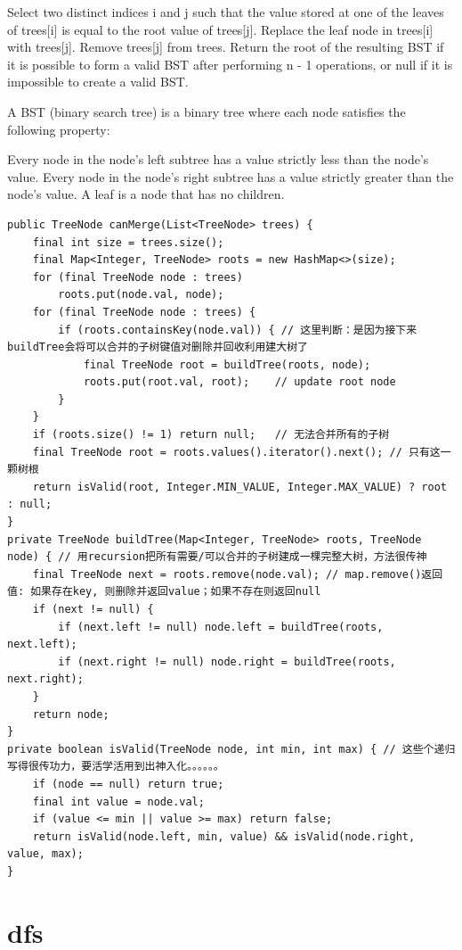 \documentclass[9pt, b5paper]{article}
\begin{document}
Select two distinct indices i and j such that the value stored at one of the leaves of trees[i] is equal to the root value of trees[j].
Replace the leaf node in trees[i] with trees[j].
Remove trees[j] from trees.
Return the root of the resulting BST if it is possible to form a valid BST after performing n - 1 operations, or null if it is impossible to create a valid BST.

A BST (binary search tree) is a binary tree where each node satisfies the following property:

Every node in the node's left subtree has a value strictly less than the node's value.
Every node in the node's right subtree has a value strictly greater than the node's value.
A leaf is a node that has no children.
\begin{verbatim}
public TreeNode canMerge(List<TreeNode> trees) {
    final int size = trees.size();
    final Map<Integer, TreeNode> roots = new HashMap<>(size);
    for (final TreeNode node : trees) 
        roots.put(node.val, node);
    for (final TreeNode node : trees) {
        if (roots.containsKey(node.val)) { // 这里判断：是因为接下来buildTree会将可以合并的子树键值对删除并回收利用建大树了
            final TreeNode root = buildTree(roots, node);
            roots.put(root.val, root);    // update root node
        }
    }
    if (roots.size() != 1) return null;   // 无法合并所有的子树
    final TreeNode root = roots.values().iterator().next(); // 只有这一颗树根
    return isValid(root, Integer.MIN_VALUE, Integer.MAX_VALUE) ? root : null;
}
private TreeNode buildTree(Map<Integer, TreeNode> roots, TreeNode node) { // 用recursion把所有需要/可以合并的子树建成一棵完整大树，方法很传神
    final TreeNode next = roots.remove(node.val); // map.remove()返回值: 如果存在key, 则删除并返回value；如果不存在则返回null
    if (next != null) {
        if (next.left != null) node.left = buildTree(roots, next.left);
        if (next.right != null) node.right = buildTree(roots, next.right);
    }
    return node;
}
private boolean isValid(TreeNode node, int min, int max) { // 这些个递归写得很传功力，要活学活用到出神入化。。。。。。
    if (node == null) return true;
    final int value = node.val;
    if (value <= min || value >= max) return false;
    return isValid(node.left, min, value) && isValid(node.right, value, max);
}
\end{verbatim}

\section{dfs}
\label{sec-9}
\end{document}
